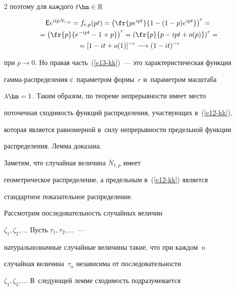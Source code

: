 \begin{multicols}{2}
поэтому для каждого $t\hm\in\mathbb{R}$


\begin{multline}


{\sf


E}e^{itpN_{r,p}}=f_{r,p}(pt)=\left(\fr{pe^{ipt}}{1-(1-p)e^{ipt}}\right)^r={}\\


{}=


\left(\fr{p}{e^{-ipt}-1+p}\right)^r=\left(\fr{p}{p-ipt+o(p)}\right)^r={}


\\


{}=[1-it+o(1)]^{-r}\longrightarrow (1-it)^{-r}\label{e13-kk}


\end{multline}


при $p\to 0$. Но правая часть~(\ref{e13-kk})~--- это характеристическая функция


гам\-ма-рас\-пре\-де\-ле\-ния с~параметром формы~$r$ и~параметром масштаба


$\lambda\hm=1$. Таким образом, по теореме непрерывности имеет место


поточечная сходимость функций распределения, участвующих в~(\ref{e12-kk}),


которая является равномерной в~силу непрерывности предельной функции


распределения. Лемма доказана.





\smallskip





Заметим, что случайная величина $\overline N_{1,p}$ имеет


геометрическое распределение, а предельным в~(\ref{e12-kk}) является


стандартное показательное распределение.





Рассмотрим последовательность случайных величин


$\zeta_1,\zeta_2,\ldots$ Пусть $\tau_1,\tau_2,\ldots$~---


на\-ту\-раль\-но\-знач\-ные случайные величины такие, что при каждом~$n$ 


случайная величина~$\tau_n$ независима от последовательности


$\zeta_1,\zeta_2,\ldots$ В~следующей лемме сходимость подразумевается



\end{multicols}
